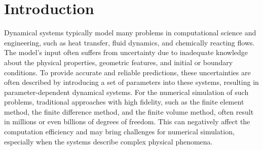 \documentclass[10pt,a4paper]{article}
\numberwithin{equation}{section}
\numberwithin{lemma}{section}
\numberwithin{example}{section}
\numberwithin{definition}{section}
\numberwithin{assumption}{section}
\numberwithin{theorem}{section}
\numberwithin{proposition}{section}
\numberwithin{corollary}{section}
\numberwithin{remark}{section}
\begin{document}
\section{Introduction}
Dynamical systems typically model many problems in computational science and engineering, such as heat transfer, fluid dynamics, and chemically reacting flows. 
The model's input often suffers from uncertainty due to inadequate knowledge about the physical properties, geometric features, and initial or boundary conditions.
To provide accurate and reliable predictions, these uncertainties are often described by introducing a set of parameters into these systems, resulting in parameter-dependent dynamical systems.
For the numerical simulation of such problems, 
traditional approaches with high fidelity, such as the finite element method, the finite difference method, and the finite volume method, often result in millions or even billions of degrees of freedom. 
This can negatively affect the computation efficiency
and may bring challenges for numerical simulation, especially when the systems describe complex physical phenomena.
\end{document}
